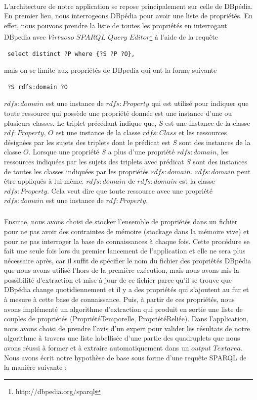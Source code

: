 \paragraph{}
L'architecture de notre application se repose principalement sur celle de DBpédia. En premier lieu, nous interrogeons DBpédia pour avoir une liste de propriétés. En effet, nous pouvons prendre la liste de toutes les propriétés en interrogant DBpedia avec $Virtuoso$ $SPARQL$ $Query$ $Editor$\footnote{http://dbpedia.org/sparql}  à l'aide de la requête \begin{verbatim} select distinct ?P where {?S ?P ?O},\end{verbatim}mais on se limite aux propriétés de DBpedia qui ont la forme suivante \begin{verbatim} ?S rdfs:domain ?O \end{verbatim} $rdfs:domain$ est une instance de $rdfs:Property$ qui est utilisé pour indiquer que toute ressource qui possède une propriété donnée est une instance d'une ou plusieurs classes. Le triplet précédant indique que, $S$ est une instance de la classe $rdf:Property$, $O$ est une instance de la classe $rdfs:Class$ et les ressources désignées par les sujets des triplets dont le prédicat est $S$ sont des instances de la classe $O$. Lorsque une propriété $S$ a plus d'une propriété $rdfs:domain$, les ressources indiquées par les sujets des triplets avec prédicat $S$ sont des instances de toutes les classes indiquées par les propriétés $rdfs:domain$. $rdfs:domain$ peut être appliqués à lui-même. $rdfs:domain$ de $rdfs:domain$ est la classe $rdfs:Property$. Cela veut dire que toute ressource avec une propriété $rdfs:domain$ est une instance de $rdf:Property$. 
\subparagraph{}
Ensuite, nous avons choisi de stocker l'ensemble de propriétés dans un fichier pour ne pas avoir des contraintes de mémoire (stockage dans la mémoire vive) et pour ne pas interroger la base de connaissances à chaque fois. Cette procédure se fait une seule fois lors du premier lancement de l'application et elle ne sera plus nécessaire après, car il suffit de spécifier le nom du fichier des propriétés DBpédia que nous avons utilisé l'hors de la première exécution, mais nous avons mis la possibilité d'extraction et mise à jour de ce fichier parce qu'il se trouve que DBpédia change quotidiennement et il y a des propriétés qui s'ajoutent au fur et à mesure à cette base de connaissance. Puis, à partir de ces propriétés, nous avons implémenté un algorithme d'extraction qui produit en sortie une liste de couples de propriétés (PropriétéTemporelle, PropriétéReliée). Dans l'application, nous avons choisi de prendre l'avis d'un expert pour valider les résultats de notre algorithme à travers une liste labellisée d'une partie des quadruplets que nous avons réussi à former et à extraire automatiquement dans un $output$ $Textarea$. Nous avons écrit notre hypothèse de base sous forme d'une requête SPARQL de la manière suivante :
